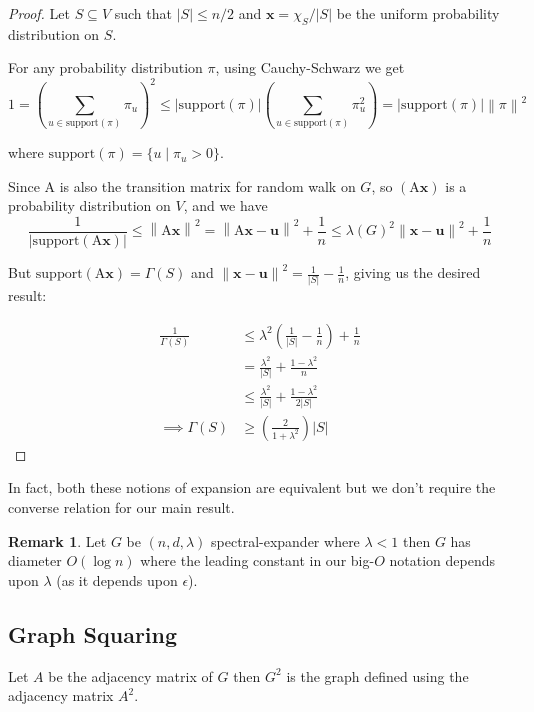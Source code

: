 \documentclass[10pt]{article}
\theoremstyle{plain}
\theoremstyle{definition}
\newtheorem*{remark}{Remark}
\newcommand{\norm}[1]{\left\lVert#1\right\rVert}
\begin{document}
\begin{proof}
Let $S \subseteq V$ such that $|S| \leq n/2$ and $\mathbf{x} = \chi_S/|S|$ be the uniform probability distribution on $S$. 

For any probability distribution $\pi$, using Cauchy-Schwarz we get $$1 = \left(\sum_{u \in \text{support}(\pi)} \pi_u\right)^2 \leq |\text{support}(\pi)| \left(\sum_{u \in \text{support}(\pi)} \pi_u^2\right) = |\text{support}(\pi)| \norm{\pi}^2$$

where $\text{support}(\pi) = \{u \mid \pi_u > 0\}$. 

Since $\mathrm{A}$ is also the transition matrix for random walk on $G$, so $(\mathrm{A}\mathbf{x})$ is a probability distribution on $V$, and we have
$$\frac{1}{|\text{support}(\mathrm{A}\mathbf{x})|} \leq  \norm{\mathrm{A}\mathbf{x}}^2 = \norm{\mathrm{A}\mathbf{x} - \mathbf{u}}^2 + \frac1n \leq \lambda(G)^2\norm{\mathbf{x} - \mathbf{u}}^2 + \frac1n$$

But $\text{support}(\mathrm{A}\mathbf{x}) = \Gamma(S)$ and
$\norm{\mathbf{x} - \mathbf{u}}^2 = \frac{1}{|S|} - \frac1n$, giving us the desired result:

\begin{align*}
    \frac{1}{\Gamma(S)} &\leq \lambda^2\left(\frac{1}{|S|}-\frac1n\right) + \frac1n \\
    &= \frac{\lambda^2}{|S|} + \frac{1 - \lambda^2}{n} \\
    &\leq \frac{\lambda^2}{|S|} + \frac{1 - \lambda^2}{2|S|} \\
    \implies \Gamma(S) &\geq \left(\frac{2}{1 + \lambda^2}\right)|S|
\end{align*}
\end{proof}

In fact, both these notions of expansion are equivalent but we don't require the converse relation for our main result.

\begin{remark}
Let $G$ be $(n,d,\lambda)$ spectral-expander where $\lambda < 1$ then $G$ has diameter $O(\log n)$ where the leading constant in our big-$O$ notation depends upon $\lambda$ (as it depends upon $\epsilon$).
\end{remark}

\subsection{Graph Squaring}

Let $A$ be the adjacency matrix of $G$ then $G^2$ is the graph defined using the adjacency matrix $A^2$.
\end{document}
